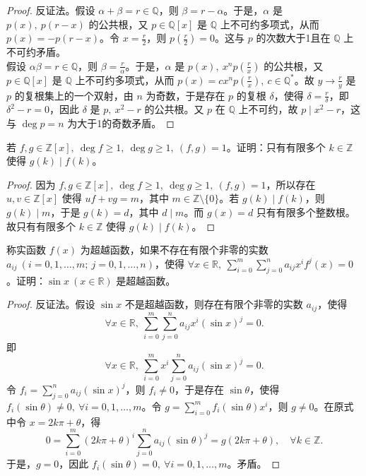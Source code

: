 \documentclass[lang=cn,12pt]{elegantbook}
\begin{document}
\begin{proof}
    反证法。假设 \( \alpha + \beta = r \in \mathbb{Q} \)，则 \( \beta = r - \alpha \)。于是，\( \alpha \) 是 \( p(x),\ p(r - x) \) 的公共根，又 \( p \in \mathbb{Q}[x] \) 是 \( \mathbb{Q} \) 上不可约多项式，从而 \( p(x) = -p(r - x) \)。令 \( x = \frac{r}{2} \)，则 \( p\left( \frac{r}{2} \right) = 0 \)。这与 \( p \) 的次数大于1且在 \( \mathbb{Q} \) 上不可约矛盾。\\
    假设 \( \alpha \beta = r \in \mathbb{Q} \)，则 \( \beta = \frac{r}{\alpha} \)。于是，\( \alpha \) 是 \( p(x),\ x^n p\left( \frac{r}{x} \right) \) 的公共根，又 \( p \in \mathbb{Q}[x] \) 是 \( \mathbb{Q} \) 上不可约多项式，从而 \( p(x) = c x^n p\left( \frac{r}{x} \right),\ c \in \mathbb{Q}^* \)。故 \( y \to \frac{r}{y} \) 是 \( p \) 的复根集上的一个双射，由 \( n \) 为奇数，于是存在 \( p \) 的复根 \( \delta \)，使得 \( \delta = \frac{r}{\delta} \)，即 \( \delta^2 - r = 0 \)，因此 \( \delta \) 是 \( p,\ x^2 - r \) 的公共根。又 \( p \) 在 \( \mathbb{Q} \) 上不可约，故 \( p \mid x^2 - r \)，这与 \( \deg p = n \) 为大于1的奇数矛盾。
\end{proof}

\begin{example}
     若 \( f, g \in \mathbb{Z}[x],\ \deg f \geq 1,\ \deg g \geq 1,\ (f, g) = 1 \)。证明：只有有限多个 \( k \in \mathbb{Z} \) 使得 \( g(k) \mid f(k) \)。
\end{example}

\begin{proof}
     因为 \( f, g \in \mathbb{Z}[x],\ \deg f \geq 1,\ \deg g \geq 1,\ (f, g) = 1 \)，所以存在 \( u, v \in \mathbb{Z}[x] \) 使得 \( uf + vg = m \)，其中 \( m \in \mathbb{Z} \setminus \{0\} \)。若 \( g(k) \mid f(k) \)，则 \( g(k) \mid m \)，于是 \( g(k) = d \)，其中 \( d \mid m \)。而 \( g(x) = d \) 只有有限多个整数根。故只有有限多个 \( k \in \mathbb{Z} \) 使得 \( g(k) \mid f(k) \)。
\end{proof}

\begin{example}
     称实函数 \( f(x) \) 为超越函数，如果不存在有限个非零的实数 \( a_{ij}\ (i=0,1,\dots,m;\ j=0,1,\dots,n) \)，使得 \( \forall x \in \mathbb{R},\ \sum_{i=0}^{m} \sum_{j=0}^{n} a_{ij}x^i f^j(x) = 0 \)。证明：\( \sin x\ (x \in \mathbb{R}) \) 是超越函数。
\end{example}

\begin{proof}
    反证法。假设 \( \sin x \) 不是超越函数，则存在有限个非零的实数 \( a_{ij} \)，使得
    \[
    \forall x \in \mathbb{R},\ \sum_{i=0}^{m} \sum_{j=0}^{n} a_{ij}x^i (\sin x)^j = 0.
    \]
    即
    \[
    \forall x \in \mathbb{R},\ \sum_{i=0}^{m} x^i \sum_{j=0}^{n} a_{ij} (\sin x)^j = 0.
    \]
    令 \( f_i = \sum_{j=0}^{n} a_{ij} (\sin x)^j \)，则 \( f_i \neq 0 \)，于是存在 \( \sin \theta \)，使得 \( f_i(\sin \theta) \neq 0,\ \forall i = 0,1,\dots,m \)。令 \( g = \sum_{i=0}^{m} f_i(\sin \theta)x^i \)，则 \( g \neq 0 \)。在原式中令 \( x = 2k\pi + \theta \)，得
    \[
    0 = \sum_{i=0}^{m} (2k\pi + \theta)^i \sum_{j=0}^{n} a_{ij} (\sin \theta)^j = g(2k\pi + \theta),\quad \forall k \in \mathbb{Z}.
    \]
    于是，\( g = 0 \)，因此 \( f_i(\sin \theta) = 0,\ \forall i = 0,1,\dots,m \)。矛盾。
\end{proof}
\end{document}
